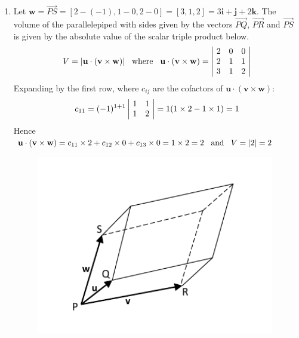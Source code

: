 \documentclass[12pt]{amsart}
\begin{document}
\begin{enumerate}
\begin{enumerate}
			\item Let $\mathbf{w}=\vec{PS}=[2-(-1), 1-0, 2-0]=[3,1,2] = 3\mathbf{i}+\mathbf{j}+2\mathbf{k}$. 				The volume of the parallelepiped with sides given by the vectors $\vec{PQ}$, $\vec{PR}$
				and $\vec{PS}$ is given by the absolute value of the scalar triple product below.
					\begin{align}
						V= |\mathbf{u} \cdot (\mathbf{v} \times \mathbf{w})| \hspace{0.3cm} \text{where}
						\hspace{0.3cm} \mathbf{u} \cdot (\mathbf{v} \times \mathbf{w})= 
						\begin{vmatrix}
							\text{ } 2	&0	&0 \text{ } \\
							\text{ } 2	&1	&1 \text{ } \\
							\text{ } 3	&1	&2 \text{ }
						\end{vmatrix} \notag
					\end{align}
				Expanding by the first row, where $c_{ij}$ are the cofactors of $\mathbf{u} \cdot 
				(\mathbf{v} \times \mathbf{w}):$
					\begin{align}
						c_{11}=(-1)^{1+1}
						\begin{vmatrix}
							\text{ } 1	&1 \text{ } \\	
							\text{ } 1	&2 \text{ }
						\end{vmatrix} = 1(1\times2-1\times1)=1 \notag
					\end{align}	
				Hence $\mathbf{u} \cdot (\mathbf{v} \times \mathbf{w})=c_{11}\times2+c_{12}\times0+
				c_{13}\times0=1\times2=2 \hspace{0.3cm} \text{and} \hspace{0.3cm} V=|2|=2$ \\
				\begin{figure}[h]
					\centering
					\includegraphics[width=4.1in]{1d.pdf}
				\end{figure}
				

\end{enumerate}
\end{enumerate}
\end{document}
